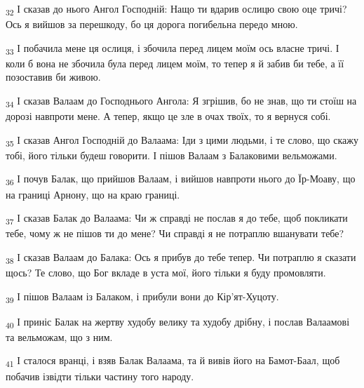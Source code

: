 \begin{tcolorbox}
\textsubscript{32} І сказав до нього Ангол Господній: Нащо ти вдарив ослицю свою оце тричі? Ось я вийшов за перешкоду, бо ця дорога погибельна передо мною.
\end{tcolorbox}
\begin{tcolorbox}
\textsubscript{33} І побачила мене ця ослиця, і збочила перед лицем моїм ось власне тричі. І коли б вона не збочила була перед лицем моїм, то тепер я й забив би тебе, а її позоставив би живою.
\end{tcolorbox}
\begin{tcolorbox}
\textsubscript{34} І сказав Валаам до Господнього Ангола: Я згрішив, бо не знав, що ти стоїш на дорозі навпроти мене. А тепер, якщо це зле в очах твоїх, то я вернуся собі.
\end{tcolorbox}
\begin{tcolorbox}
\textsubscript{35} І сказав Ангол Господній до Валаама: Іди з цими людьми, і те слово, що скажу тобі, його тільки будеш говорити. І пішов Валаам з Балаковими вельможами.
\end{tcolorbox}
\begin{tcolorbox}
\textsubscript{36} І почув Балак, що прийшов Валаам, і вийшов навпроти нього до Їр-Моаву, що на границі Арнону, що на краю границі.
\end{tcolorbox}
\begin{tcolorbox}
\textsubscript{37} І сказав Балак до Валаама: Чи ж справді не послав я до тебе, щоб покликати тебе, чому ж не пішов ти до мене? Чи справді я не потраплю вшанувати тебе?
\end{tcolorbox}
\begin{tcolorbox}
\textsubscript{38} І сказав Валаам до Балака: Ось я прибув до тебе тепер. Чи потраплю я сказати щось? Те слово, що Бог вкладе в уста мої, його тільки я буду промовляти.
\end{tcolorbox}
\begin{tcolorbox}
\textsubscript{39} І пішов Валаам із Балаком, і прибули вони до Кір'ят-Хуцоту.
\end{tcolorbox}
\begin{tcolorbox}
\textsubscript{40} І приніс Балак на жертву худобу велику та худобу дрібну, і послав Валаамові та вельможам, що з ним.
\end{tcolorbox}
\begin{tcolorbox}
\textsubscript{41} І сталося вранці, і взяв Балак Валаама, та й вивів його на Бамот-Баал, щоб побачив ізвідти тільки частину того народу.
\end{tcolorbox}
